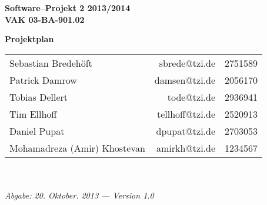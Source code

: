 \documentclass[fontsize=12pt,paper=a4,twoside]{scrartcl}
\begin{document}
  \thispagestyle{fancy}
  \fancyhead[LO,RE]{ }
  \fancyfoot[C]{}

  \vspace{3cm}

  \begin{minipage}[H]{\textwidth}
  \begin{center}
  \bf
  \Large
  Software--Projekt 2 2013/2014\\
  \smallskip
  \small
  VAK 03-BA-901.02\\
  \vspace{3cm}
  \end{center}
  \end{minipage}
  \begin{minipage}[H]{\textwidth}
  \begin{center}
  \vspace{1cm}
  \bf
  \Large Projektplan\\
  \vfill
  \end{center}
  \end{minipage}
  \vfill
  \begin{minipage}[H]{\textwidth}
  \begin{center}
  \sf
  \begin{tabular}{lrr}
  Sebastian Bredehöft & sbrede@tzi.de & 2751589\\
  Patrick Damrow & damsen@tzi.de & 2056170\\
  Tobias Dellert & tode@tzi.de & 2936941\\
  Tim Ellhoff & tellhoff@tzi.de & 2520913\\
  Daniel Pupat & dpupat@tzi.de & 2703053\\
  Mohamadreza (Amir) Khostevan & amirkh@tzi.de & 1234567\\
  \end{tabular}
  \\ ~
  \vspace{2cm}
  \\
  \it Abgabe: 20. Oktober. 2013 --- Version 1.0\\ ~
  \end{center}
  \end{minipage}


\end{document}
